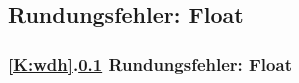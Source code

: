 \def\stitle{Rundungsfehler: Float}
\subsection{\stitle}\label{S:Float}
\begin{frame}[t]%
 \frametitle{\ref{K:wdh}.\ref{S:Float} \stitle}



\end{frame}

